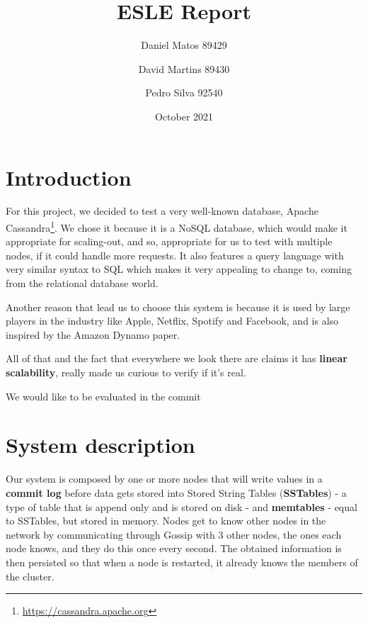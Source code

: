 \documentclass[runningheads]{llncs}
\author{
    Daniel Matos \email{daniel.m.matos@tecnico.ulisboa.pt} 89429 \and
    David Martins \email{david.d.martins@tecnico.ulisboa.pt } 89430 \and
    Pedro Silva \email{pedro.m.e.silva@tecnico.ulisboa.pt} 92540
}
\institute{Group 4}
\title{ESLE Report}
\date{October 2021}
\begin{document}
\maketitle

\section{Introduction}

For this project, we decided to test a very well-known database, Apache Cassandra\footnote{\url{https://cassandra.apache.org}}.
We chose it because it is a NoSQL database, which would make it appropriate for scaling-out, and so, appropriate for us to test with multiple nodes, if it could handle more requests. It also features a query language with very similar syntax to SQL which makes it very appealing to change to, coming from the relational database world.\par
Another reason that lead us to choose this system is because it is used by large players in the industry like Apple\cite{apple}, Netflix\cite{netflix}, Spotify\cite{spotify} and Facebook\cite{instagram}, and is also inspired by the Amazon Dynamo paper\cite{dynamo}. \par
All of that and the fact that everywhere we look there are claims it has \textbf{linear scalability}, really made us curious to verify if it's real.\par
We would like to be evaluated in the commit %

\section{System description}


Our system is composed by one or more nodes that will write values in a \textbf{commit log} before data gets stored into Stored String Tables (\textbf{SSTables}) - a type of table that is append only and is stored on disk - and \textbf{memtables} - equal to SSTables, but stored in memory. Nodes get to know other nodes in the network by communicating through Gossip with 3 other nodes, the ones each node knows, and they do this once every second. The obtained information is then persisted so that when a node is restarted, it already knows the members of the cluster.\par
\end{document}
